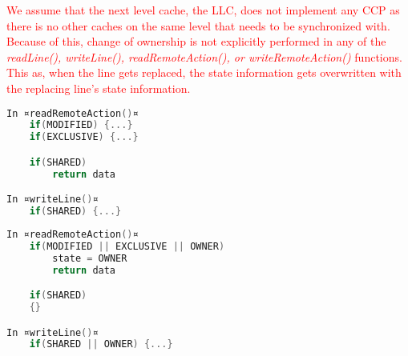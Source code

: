 \textcolor{red}{We assume that the next level cache, the LLC, does not implement any CCP as there is no other caches on the same level that needs to be synchronized with. Because of this, change of ownership is not explicitly performed in any of the \textit{readLine(), writeLine(), readRemoteAction(), or writeRemoteAction()} functions. This as, when the line gets replaced, the state information gets overwritten with the replacing line's state information.} 

\par\noindent


\begin{minipage}[t]{.5\textwidth}

	\begin{lstlisting}[language=C,frame=lrtb,style=base]
In ¤readRemoteAction()¤
	if(MODIFIED) {...}
	if(EXCLUSIVE) {...}

	if(SHARED)
		return data		

In ¤writeLine()¤
	if(SHARED) {...}
	\end{lstlisting}%
\end{minipage}%
\hfill
\begin{minipage}[t]{.5\textwidth}

	\begin{lstlisting}[language=C,frame=lrtb,style=base]
In ¤readRemoteAction()¤
	if(MODIFIED || EXCLUSIVE || OWNER) 
		state = OWNER
		return data

	if(SHARED)
	{}

In ¤writeLine()¤
	if(SHARED || OWNER) {...}
	\end{lstlisting}%
\end{minipage}%
